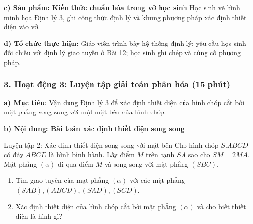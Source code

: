\documentclass[12pt, a4paper]{article}
\begin{document}
\noindent \textbf{c) Sản phẩm: Kiến thức chuẩn hóa trong vở học sinh}
Học sinh vẽ hình minh họa Định lý 3, ghi công thức định lý và khung phương pháp xác định thiết diện vào vở.

\noindent \textbf{d) Tổ chức thực hiện:}
Giáo viên trình bày hệ thống định lý; yêu cầu học sinh đối chiếu với định lý giao tuyến ở Bài 12; học sinh ghi chép và củng cố phương pháp.

\subsubsection*{3. Hoạt động 3: Luyện tập giải toán phân hóa (15 phút)}

\noindent \textbf{a) Mục tiêu:}
Vận dụng Định lý 3 để xác định thiết diện của hình chóp cắt bởi mặt phẳng song song với một mặt bên của hình chóp.

\noindent \textbf{b) Nội dung: Bài toán xác định thiết diện song song}
\begin{pedabox}{Luyện tập 2: Xác định thiết diện song song với mặt bên}
Cho hình chóp $S.ABCD$ có đáy $ABCD$ là hình bình hành. Lấy điểm $M$ trên cạnh $SA$ sao cho $SM = 2MA$. Mặt phẳng $(\alpha)$ đi qua điểm $M$ và song song với mặt phẳng $(SBC)$.
\begin{enumerate}[leftmargin=0.6cm]
    \item Tìm giao tuyến của mặt phẳng $(\alpha)$ với các mặt phẳng $(SAB), (ABCD), (SAD), (SCD)$.
    \item Xác định thiết diện của hình chóp cắt bởi mặt phẳng $(\alpha)$ và cho biết thiết diện là hình gì?
\end{enumerate}
\end{pedabox}
\end{document}
